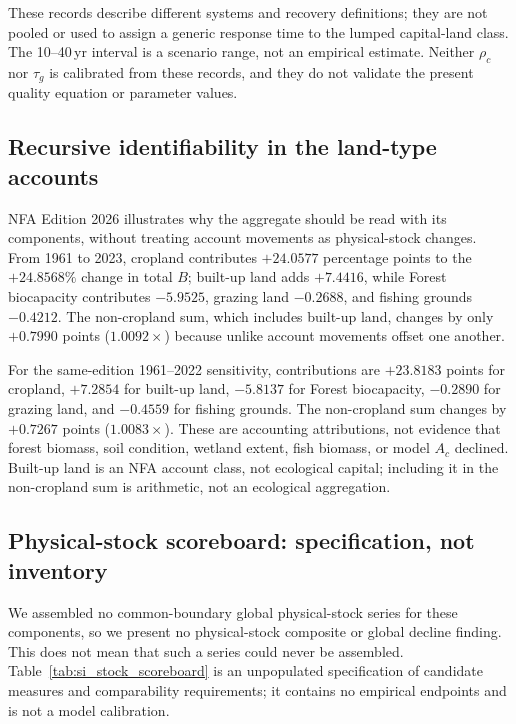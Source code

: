 \documentclass[11pt,a4paper]{article}
\begin{document}
These records describe different systems and recovery definitions; they are not pooled or used to assign a generic response time to the lumped capital-land class. The 10--40\,yr interval is a scenario range, not an empirical estimate. Neither $\rho_c$ nor $\tau_g$ is calibrated from these records, and they do not validate the present quality equation or parameter values.

\subsection{Recursive identifiability in the land-type accounts}\label{si:recursive}

NFA Edition 2026 illustrates why the aggregate should be read with its components, without treating account movements as physical-stock changes. From 1961 to 2023, cropland contributes $+24.0577$ percentage points to the $+24.8568\%$ change in total $B$; built-up land adds $+7.4416$, while Forest biocapacity contributes $-5.9525$, grazing land $-0.2688$, and fishing grounds $-0.4212$. The non-cropland sum, which includes built-up land, changes by only $+0.7990$ points ($1.0092\times$) because unlike account movements offset one another.

For the same-edition 1961--2022 sensitivity, contributions are $+23.8183$ points for cropland, $+7.2854$ for built-up land, $-5.8137$ for Forest biocapacity, $-0.2890$ for grazing land, and $-0.4559$ for fishing grounds. The non-cropland sum changes by $+0.7267$ points ($1.0083\times$). These are accounting attributions, not evidence that forest biomass, soil condition, wetland extent, fish biomass, or model $A_c$ declined. Built-up land is an NFA account class, not ecological capital; including it in the non-cropland sum is arithmetic, not an ecological aggregation.

\subsection{Physical-stock scoreboard: specification, not inventory}\label{si:stocks}

We assembled no common-boundary global physical-stock series for these components, so we present no physical-stock composite or global decline finding. This does not mean that such a series could never be assembled. Table~\ref{tab:si_stock_scoreboard} is an unpopulated specification of candidate measures and comparability requirements; it contains no empirical endpoints and is not a model calibration.
\end{document}
